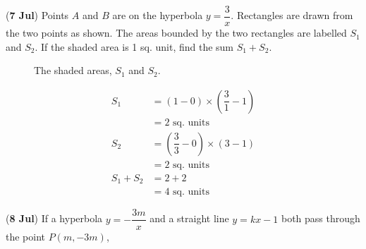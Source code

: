 \documentclass[12pt,answers]{exam}
\renewcommand{\frac}[2]{\dfrac{#1}{#2}}
\newcommand{\qndate}[2]{(\textbf{#1 #2})}
\begin{document}
\begin{questions}
  \question \qndate{7}{Jul} Points $A$ and $B$ are on the hyperbola
  $y = \frac{3}{x}$.
  Rectangles are drawn from the two points as shown. The areas
  bounded by the two
  rectangles are labelled $S_1$ and $S_2$. If the shaded area is 1
  sq. unit, find
  the sum $S_1 + S_2$.
  \begin{figure}[htpb]
    \centering
    \caption{The shaded areas, $S_1$ and $S_2$.}
    \label{fig:0707_Hyper}
  \end{figure}
  \begin{solution}
    \begin{align*}
      S_1       & = \left(1 - 0\right) \times \left(\frac{3}{1}-1\right)   \\
      & = 2 \text{ sq. units}                                    \\
      S_2       & = \left(\frac{3}{3} - 0\right) \times \left(3 - 1\right) \\
      & = 2 \text{ sq. units}                                    \\
      S_1 + S_2 & = 2 + 2                                                  \\
      & = 4 \text{ sq. units}
    \end{align*}
  \end{solution}

  \question \qndate{8}{Jul} If a hyperbola $y = -\frac{3m}{x}$ and a
  straight line
  $y = kx-1$ both pass through the point $P(m,-3m)$,
  \begin{parts}

\end{parts}
\end{questions}
\end{document}

